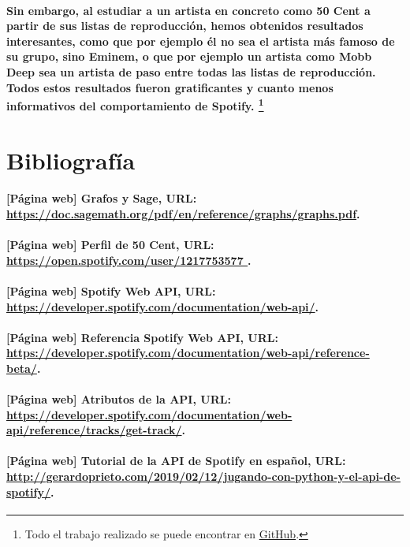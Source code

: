 \documentclass[11pt,spanish]{article}
\begin{document}
\paragraph*{Sin embargo, al estudiar a un artista en concreto como 50 Cent a partir de sus listas de reproducción, hemos obtenidos resultados interesantes, como que por ejemplo él no sea el artista más famoso de su grupo, sino Eminem, o que por ejemplo un artista como Mobb Deep sea un artista de paso entre todas las listas de reproducción.
Todos estos resultados fueron gratificantes y cuanto menos informativos del comportamiento de Spotify.
\footnote{Todo el trabajo realizado se puede encontrar en \href{https://github.com/AbramsM1A2/Spotify}{GitHub}.}}

\section{Bibliografía}

\paragraph*{[Página web] Grafos y Sage, URL: \url{https://doc.sagemath.org/pdf/en/reference/graphs/graphs.pdf}.}

\paragraph*{[Página web] Perfil de 50 Cent, URL: \url{https://open.spotify.com/user/1217753577 }.}

\paragraph*{[Página web] Spotify Web API, URL: \url{https://developer.spotify.com/documentation/web-api/}.}

\paragraph*{[Página web] Referencia Spotify Web API, URL: \url{https://developer.spotify.com/documentation/web-api/reference-beta/}.}

\paragraph*{[Página web] Atributos de la API, URL: \url{https://developer.spotify.com/documentation/web-api/reference/tracks/get-track/}.}

\paragraph*{[Página web] Tutorial de la API de Spotify en español, URL: \url{http://gerardoprieto.com/2019/02/12/jugando-con-python-y-el-api-de-spotify/}.}
\end{document}
